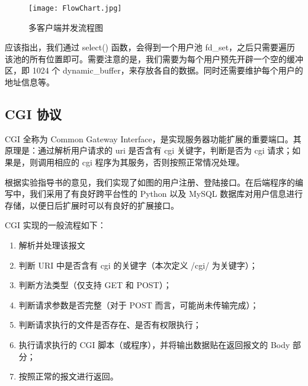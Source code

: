 \begin{figure}[htbp!]
  \centering
  \texttt{[image: FlowChart.jpg]}
  \caption{多客户端并发流程图}\label{fig:MultipleChart}
\end{figure}

应该指出，我们通过 select() 函数，会得到一个用户池 fd\_set，之后只需要遍历该池的所有位置即可。需要注意的是，我们需要为每个用户预先开辟一个空的缓冲区，即 1024 个 dynamic\_buffer，来存放各自的数据。同时还需要维护每个用户的地址信息等。

\subsection{CGI 协议}\label{sec:CGI}

CGI 全称为 Common Gateway Interface，是实现服务器功能扩展的重要端口。其原理是：通过解析用户请求的 uri 是否含有 cgi 关键字，判断是否为 cgi 请求；如果是，则调用相应的 cgi 程序为其服务，否则按照正常情况处理。

根据实验指导书的意见，我们实现了如图的用户注册、登陆接口。在后端程序的编写中，我们采用了有良好跨平台性的 Python 以及 MySQL 数据库对用户信息进行存储，以便日后扩展时可以有良好的扩展接口。


CGI 实现的一般流程如下：
\begin{enumerate}
  \item 解析并处理该报文
  \item 判断 URI 中是否含有 cgi 的关键字（本次定义 /cgi/ 为关键字）；
  \item 判断方法类型（仅支持 GET 和 POST）；
  \item 判断请求参数是否完整（对于 POST 而言，可能尚未传输完成）；
  \item 判断请求执行的文件是否存在、是否有权限执行；
  \item 执行请求执行的 CGI 脚本（或程序），并将输出数据贴在返回报文的 Body 部分；
  \item 按照正常的报文进行返回。
\end{enumerate}
